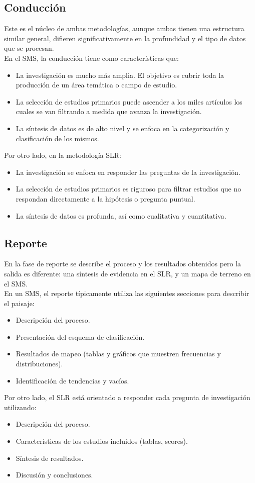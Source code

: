 \subsection{Conducción}
Este es el núcleo de ambas metodologías, aunque ambas tienen una estructura similar general, difieren significativamente en la profundidad y el tipo de datos que se procesan.\\
 
En el SMS, la conducción tiene como características que:
\begin{itemize}
    \item La investigación es mucho más amplia. El objetivo es cubrir toda la producción de un área temática o campo de estudio.
    \item La selección de estudios primarios puede ascender a los miles artículos los cuales se van filtrando a medida que avanza la investigación.
    \item La síntesis de datos es de alto nivel y se enfoca en la categorización y clasificación de los mismos.\\
\end{itemize}

Por otro lado, en la metodología SLR:
\begin{itemize}
    \item La investigación se enfoca en responder las preguntas de la investigación.
    \item La selección de estudios primarios es riguroso para filtrar estudios que no respondan directamente a la hipótesis o pregunta puntual.
    \item La síntesis de datos es profunda, así como cualitativa y cuantitativa.\\ 

\end{itemize}

\subsection{Reporte}
En la fase de reporte se describe el proceso y los resultados obtenidos pero la salida es diferente: una síntesis de evidencia en el SLR, y un mapa de terreno en el SMS.\\

En un SMS, el reporte típicamente utiliza las siguientes secciones para describir el paisaje:
\begin{itemize}
    \item Descripción del proceso.
    \item Presentación del esquema de clasificación.
    \item Resultados de mapeo (tablas y gráficos que muestren frecuencias y distribuciones).
    \item Identificación de tendencias y vacíos.\\
\end{itemize}

Por otro lado, el SLR está orientado a responder cada pregunta de investigación utilizando:
\begin{itemize}
    \item Descripción del proceso.
    \item Características de los estudios incluidos (tablas, scores).
    \item Síntesis de resultados.
    \item Discusión y conclusiones.\\
\end{itemize}